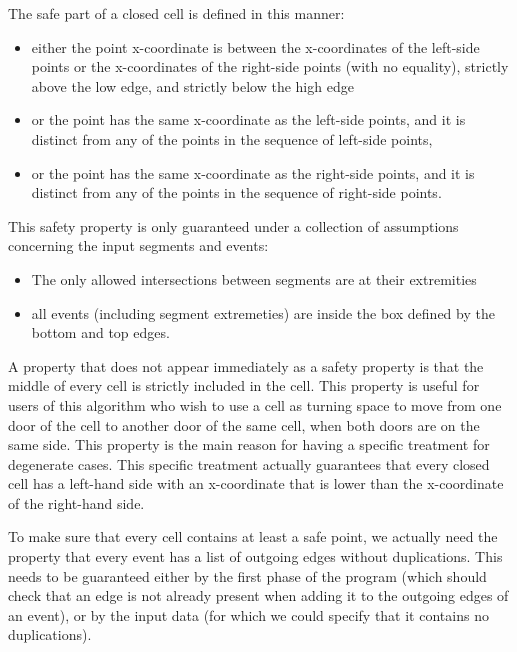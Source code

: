 \documentclass[a4paper, USenglish, cleveref, autoref, thm-restate]{lipics-v2021}
\begin{document}
The safe part of a closed cell is defined in this manner:
\begin{itemize}
\item either the point x-coordinate is between the x-coordinates of
  the left-side points or the x-coordinates of the right-side points
  (with no equality), strictly above the low edge, and strictly below
  the high edge
\item or the point has the same x-coordinate as the left-side points,
  and it is distinct from any of the points in the sequence of
  left-side points,
\item or the point has the same x-coordinate as the right-side points,
  and it is distinct from any of the points in the sequence of
  right-side points.
\end{itemize}

This safety property is only guaranteed under a collection of
assumptions concerning the input segments and events:
\begin{itemize}
\item The only allowed intersections between segments are at their
  extremities
\item all events (including segment extremeties) are inside the box
 defined by the bottom and top edges.
\end{itemize}

A property that does not appear immediately as a safety property is
that the middle of every cell is strictly included in the cell.  This
property is useful for users of this algorithm who wish to use a cell
as turning space to move from one door of the cell to another door of
the same cell, when both doors are on the same side.  This property is
the main reason for having a specific treatment for degenerate cases.
This specific treatment actually guarantees that every closed cell has
a left-hand side with an x-coordinate that is lower than the
x-coordinate of the right-hand side.

To make sure that every cell contains at least a safe point, we
actually need the property that every event has a list of outgoing
edges without duplications.  This needs to be guaranteed either by the
first phase of the program (which should check that an edge is not
already present when adding it to the outgoing edges of an event), or
by the input data (for which we could specify that it contains no
duplications).
\end{document}
